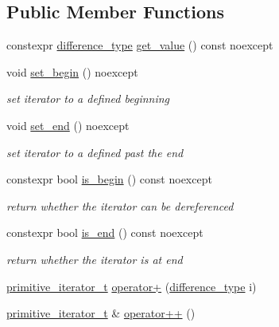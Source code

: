 \subsection*{Public Member Functions}
\begin{DoxyCompactItemize}
\item 
constexpr \hyperlink{classnlohmann_1_1detail_1_1primitive__iterator__t_af3db0d5c90de427d51645fe73a015553}{difference\+\_\+type} \hyperlink{classnlohmann_1_1detail_1_1primitive__iterator__t_ae952990886ca1756229f916661a8af81}{get\+\_\+value} () const noexcept
\item 
void \hyperlink{classnlohmann_1_1detail_1_1primitive__iterator__t_a9d9b005906106e12aed738f97d7fee42}{set\+\_\+begin} () noexcept
\begin{DoxyCompactList}\small\item\em set iterator to a defined beginning \end{DoxyCompactList}\item 
void \hyperlink{classnlohmann_1_1detail_1_1primitive__iterator__t_ad26a823483846a12d890c3feed3097eb}{set\+\_\+end} () noexcept
\begin{DoxyCompactList}\small\item\em set iterator to a defined past the end \end{DoxyCompactList}\item 
constexpr bool \hyperlink{classnlohmann_1_1detail_1_1primitive__iterator__t_a8d1a7d46b3fcd06edd034f04ededb5e4}{is\+\_\+begin} () const noexcept
\begin{DoxyCompactList}\small\item\em return whether the iterator can be dereferenced \end{DoxyCompactList}\item 
constexpr bool \hyperlink{classnlohmann_1_1detail_1_1primitive__iterator__t_a45a7e301c23b5b90417baf2277f40b1d}{is\+\_\+end} () const noexcept
\begin{DoxyCompactList}\small\item\em return whether the iterator is at end \end{DoxyCompactList}\item 
\hyperlink{classnlohmann_1_1detail_1_1primitive__iterator__t}{primitive\+\_\+iterator\+\_\+t} \hyperlink{classnlohmann_1_1detail_1_1primitive__iterator__t_a092b20d1f229be095ed974db136e6234}{operator+} (\hyperlink{classnlohmann_1_1detail_1_1primitive__iterator__t_af3db0d5c90de427d51645fe73a015553}{difference\+\_\+type} i)
\item 
\hyperlink{classnlohmann_1_1detail_1_1primitive__iterator__t}{primitive\+\_\+iterator\+\_\+t} \& \hyperlink{classnlohmann_1_1detail_1_1primitive__iterator__t_a58625f64a2670a8bd2bdc8c3714dac00}{operator++} ()

\end{DoxyCompactItemize}
